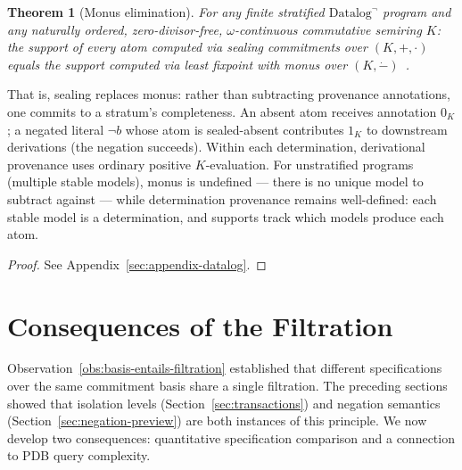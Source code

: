 \documentclass[acmsmall,review,anonymous]{acmart}
\newtheorem{theorem}{Theorem}
\theoremstyle{remark}
\numberwithin{definition}{section}
\numberwithin{theorem}{section}
\numberwithin{lemma}{section}
\numberwithin{corollary}{section}
\numberwithin{remark}{section}
\numberwithin{example}{section}
\numberwithin{observation}{section}
\numberwithin{assumption}{section}
\begin{document}
\begin{theorem}[Monus elimination]
  \label{thm:monus-elimination}
  For any finite stratified $\mbox{Datalog}^\neg$ program and any
  naturally ordered, zero-divisor-free, $\omega$-continuous commutative
  semiring $K$:
  the support of every atom computed via sealing commitments over
  $(K, +, \cdot)$ equals the support computed via least fixpoint with
  monus over $(K, \dot{-})$~\cite{dannert2021semiring}.
\end{theorem}

\noindent
That is, sealing replaces monus: rather than subtracting provenance
annotations, one commits to a stratum's completeness.
An absent atom receives annotation $0_K$; a negated literal
$\neg b$ whose atom is sealed-absent contributes $1_K$ to
downstream derivations (the negation succeeds).
Within each determination, derivational provenance uses ordinary
positive $K$-evaluation.
For unstratified programs (multiple stable models), monus is undefined
--- there is no unique model to subtract against --- while
determination provenance remains well-defined: each stable model is a
determination, and supports track which models produce each atom.

\begin{proof}
  See Appendix~\ref{sec:appendix-datalog}.
\end{proof}

\section{Consequences of the Filtration}
\label{sec:discussion}

Observation~\ref{obs:basis-entails-filtration} established that
different specifications over the same commitment basis share a single
filtration.
The preceding sections showed that isolation levels
(Section~\ref{sec:transactions}) and negation semantics
(Section~\ref{sec:negation-preview}) are both instances of this
principle.
We now develop two consequences: quantitative specification
comparison and a connection to PDB query complexity.
\end{document}
